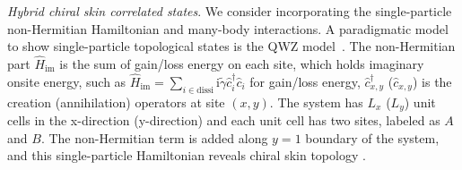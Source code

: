 \documentclass[longbibliography, aps, prx, amsmath, amssymb, amsfonts, twocolumn,superscriptaddress, footinbib]{revtex4-1}
\begin{document}
	\textit{Hybrid chiral skin correlated states}. We consider {\color{blue}{the system}} incorporating the single-particle non-Hermitian Hamiltonian and many-body interactions. 
	A paradigmatic model to show single-particle topological states is the QWZ model~\cite{qi2006topological}. The non-Hermitian part $\hat{H}_{\text{im}}$ is the sum of gain/loss energy on each site, which holds imaginary onsite energy, such as $\hat{H}_{\text{im}} = \sum_{i\in \text{dissi}} \mathrm{i}\tilde{\gamma} \hat{c}_i^{\dagger} \hat{c}_i$ for gain/loss energy, $\hat{c}_{{x}, {y}}^{\dagger}$ ($\hat{c}_{{x}, {y}}$) is the creation (annihilation) operators at site $({x},{y})$.  The system has $L_x$ ($L_y$) unit cells in the x-direction (y-direction) and each unit cell has two sites, labeled as $A$ and $B$. The non-Hermitian term is added along $y=1$ boundary of the system, and this single-particle Hamiltonian reveals chiral skin topology \cite{nakamura2023universal, ma2024non, schindler2023hermitian}.
    {}
\end{document}
